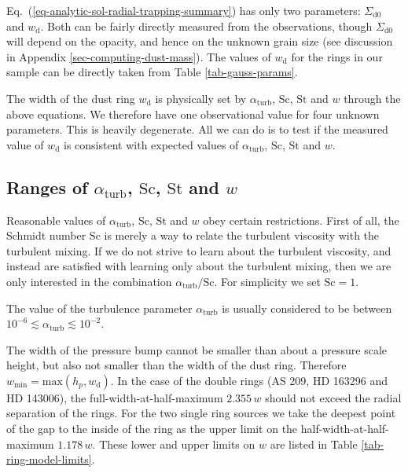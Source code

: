 \documentclass{aa}
\begin{document}
Eq.~(\ref{eq-analytic-sol-radial-trapping-summary}) has only two parameters:
$\Sigma_{\mathrm{d0}}$ and $w_{\mathrm{d}}$. Both can be fairly directly
measured from the observations, though $\Sigma_{\mathrm{d0}}$ will depend on the
opacity, and hence on the unknown grain size (see discussion in Appendix
\ref{sec-computing-dust-mass}). The values of $w_{\mathrm{d}}$ for
the rings in our sample can be directly taken from Table \ref{tab-gauss-params}.

The width of the dust ring $w_{\mathrm{d}}$ is physically set by
$\alpha_{\mathrm{turb}}$, $\mathrm{Sc}$, $\mathrm{St}$ and $w$ through the above
equations. We therefore
have one observational value for four unknown parameters. This is heavily
degenerate. All we can do is to test if the measured value of
$w_{\mathrm{d}}$ is consistent with expected values of $\alpha_{\mathrm{turb}}$,
$\mathrm{Sc}$, $\mathrm{St}$ and $w$.

\subsection{Ranges of $\alpha_{\mathrm{turb}}$, $\mathrm{Sc}$, $\mathrm{St}$ and $w$}
\label{sec-ranges-of-params}
%
Reasonable values of $\alpha_{\mathrm{turb}}$, $\mathrm{Sc}$, $\mathrm{St}$ and
$w$ obey certain restrictions. First of all, the Schmidt number $\mathrm{Sc}$
is merely a way to relate the turbulent viscosity with the turbulent mixing. If
we do not strive to learn about the turbulent viscosity, and instead are
satisfied with learning only about the turbulent mixing, then we are only
interested in the combination $\alpha_{\mathrm{turb}}/\mathrm{Sc}$. For
simplicity we set $\mathrm{Sc}=1$.

The value of the turbulence parameter $\alpha_{\mathrm{turb}}$ is usually
considered to be between $10^{-6}\lesssim \alpha_{\mathrm{turb}}\lesssim
10^{-2}$.

The width of the pressure bump cannot be smaller than about a pressure
scale height, but also not smaller than the width of the dust ring.
Therefore $w_{\mathrm{min}}=\mathrm{max}(h_p,w_{\mathrm{d}})$.
In the case of the double rings (AS 209, HD 163296 and HD 143006),
the full-width-at-half-maximum $2.355\,w$ should not exceed the radial
separation of the rings. For the two single ring sources we take the deepest
point of the gap to the inside of the ring as the upper limit on the
half-width-at-half-maximum $1.178\,w$. These lower and upper limits on $w$
are listed in Table \ref{tab-ring-model-limits}.
\end{document}
